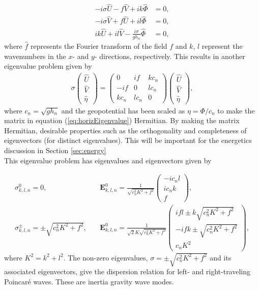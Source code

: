 \begin{align}
-i\sigma \widehat{U} - f\widehat{V} + ik\widehat{\Phi} &= 0, \label{eq:shallowBegin}\\
-i\sigma \widehat{V} + f\widehat{U} + il\widehat{\Phi} &= 0,\\
ik\widehat{U} + il\widehat{V} - \frac{i\sigma}{gh_n} \widehat{\Phi} &= 0, \label{eq:shallowEnd}
\end{align}
where $\widehat{f}$ represents the Fourier transform of the field $f$ and $k$, $l$ represent the wavenumbers in the $x$- and $y$- directions, respectively. This results in another eigenvalue problem given by
\begin{align}
\sigma \left(\begin{array}{c}
\widehat{U}\\
\widehat{V}\\
\widehat{\eta}
\end{array}\right)=\left(\begin{array}{ccc}
0 & if & kc_n\\
-if & 0 & lc_n\\
kc_n & lc_n & 0
\end{array}\right)
\left(\begin{array}{c}
\widehat{U}\\
\widehat{V}\\
\widehat{\eta}
\end{array}\right) ,\label{eq:horizEigenvalue}
\end{align}
where $c_n = \sqrt{gh_n}$ and the geopotential has been scaled as $\eta = \Phi/c_n$ to make the matrix in equation (\ref{eq:horizEigenvalue}) Hermitian. By making the matrix Hermitian, desirable properties such as the orthogonality and completeness of eigenvectors (for distinct eigenvalues). This will be important for the energetics discussion in Section \ref{sec:energy}\\

This eigenvalue problem has eigenvalues and eigenvectors given by

\begin{align}
\sigma^0_{k,l,n} = 0, \quad &\mathbf{E}^0_{k,l,n} = \frac{1}{\sqrt{c^2_n K^2 + f^2}} \left(\begin{array}{c}
-ic_nl\\
ic_nk\\
f\end{array}\right),\label{eq:geo}\\[2ex]
\sigma^\pm_{k,l,n} = \pm \sqrt{c^2_nK^2 + f^2}, \quad &\mathbf{E}^0_{k,l,n} = \frac{1}{\sqrt{2}K\sqrt{c^2_n K^2 + f^2}} \left(\begin{array}{c}
ifl \pm k\sqrt{c^2_n K^2 + f^2}\\
-ifk \pm \sqrt{c^2_n K^2 + f^2}\\
c_nK^2\end{array}\right),\label{eq:ageo}
\end{align}
where $K^2 = k^2 + l^2$. The non-zero eigenvalues, $\sigma = \pm \sqrt{c^2_nK^2 + f^2}$ and its associated eigenvectors, give the dispersion relation for left- and right-traveling Poincar\'e waves. These are inertia gravity wave modes. 

